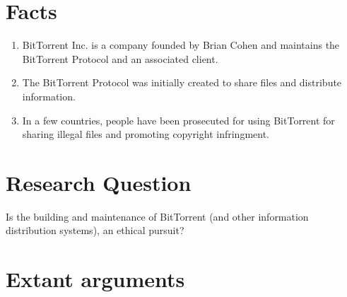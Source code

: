 \documentclass[11pt]{article}
\begin{document}
\section{Facts}
\begin{enumerate}
\item BitTorrent Inc. is a company founded by Brian Cohen and maintains the BitTorrent Protocol and an associated client. \cite{btabout}
\item The BitTorrent Protocol was initially created to share files and distribute information. \cite{btabout}
\item In a few countries, people have been prosecuted for using BitTorrent for sharing illegal files and promoting copyright infringment. \cite{tpbverdict}
\end{enumerate}

\section{Research Question}

Is the building and maintenance of BitTorrent (and other information distribution systems), an ethical pursuit?

\section{Extant arguments}
\end{document}
